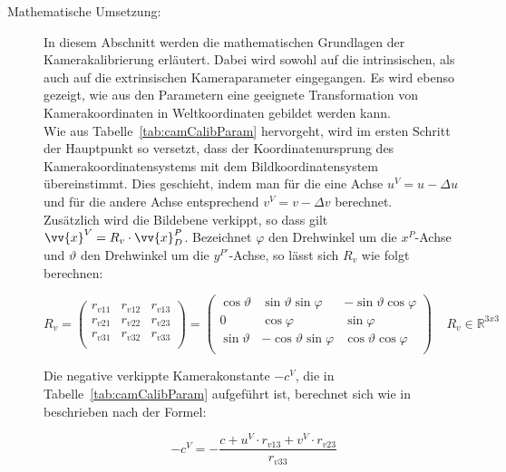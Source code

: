 \begin{description}
\item[Mathematische Umsetzung:] In diesem Abschnitt werden die mathematischen Grundlagen der Kamerakalibrierung erläutert. Dabei wird sowohl auf die intrinsischen, als auch auf die extrinsischen Kameraparameter eingegangen. Es wird ebenso gezeigt, wie aus den Parametern eine geeignete Transformation von Kamerakoordinaten in Weltkoordinaten gebildet werden kann.\\
 Wie aus Tabelle~\ref{tab:camCalibParam} hervorgeht, wird im ersten Schritt der Hauptpunkt so versetzt, dass der Koordinatenursprung des Kamerakoordinatensystems mit dem Bildkoordinatensystem übereinstimmt. Dies geschieht, indem man für die eine Achse $u^V = u - \Delta u$ und für die andere Achse entsprechend $v^V = v - \Delta v$ berechnet.\\
Zusätzlich wird die Bildebene verkippt, so dass gilt $\vv{x}^V = R_v \cdot \vv{x}^P_D$. Bezeichnet $\varphi$ den Drehwinkel um die $x^P$-Achse und $\vartheta$ den Drehwinkel um die $y^{P'}$-Achse, so lässt sich $R_v$ wie folgt berechnen:

\begin{equation}
\label{equ:Rverkippt}
R_v = 
\begin{pmatrix}
r_{v11} & r_{v12} & r_{v13} \\
r_{v21} & r_{v22} & r_{v23} \\
r_{v31} & r_{v32} & r_{v33} \\
\end{pmatrix} = 
\begin{pmatrix}
\cos\vartheta & \sin\vartheta \sin\varphi & -\sin\vartheta \cos\varphi \\
0 & \cos\varphi & \sin\varphi\\
\sin\vartheta & -\cos\vartheta \sin\varphi & \cos\vartheta \cos\varphi \\
\end{pmatrix} 
~ ~ ~ ~ ~R_v \in \mathbb{R}^{3x3}
\end{equation}

Die negative verkippte Kamerakonstante $-c^V$, die in Tabelle~\ref{tab:camCalibParam} aufgeführt ist, berechnet sich wie in~\citep{Meisel:77890} beschrieben nach der Formel:

\begin{equation}
-c^V = - \frac{c+u^V \cdot r_{v13} + v^V \cdot r_{v23}}{r_{v33}}
\end{equation}


\end{description}
